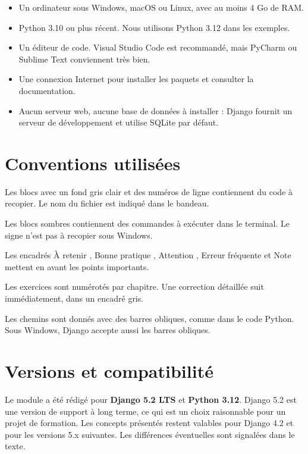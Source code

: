 \begin{itemize}
  \item Un ordinateur sous Windows, macOS ou Linux, avec au moins 4 Go de RAM.
  \item Python 3.10 ou plus récent. Nous utilisons Python 3.12 dans les exemples.
  \item Un éditeur de code. Visual Studio Code est recommandé, mais PyCharm ou
        Sublime Text conviennent très bien.
  \item Une connexion Internet pour installer les paquets et consulter la
        documentation.
  \item Aucun serveur web, aucune base de données à installer : Django fournit un
        serveur de développement et utilise SQLite par défaut.
\end{itemize}

\section*{Conventions utilisées}

\begin{description}[leftmargin=3.2cm,style=nextline]
  \item[Code Python] Les blocs avec un fond gris clair et des numéros de ligne
  contiennent du code à recopier. Le nom du fichier est indiqué dans le bandeau.
  \item[Terminal] Les blocs sombres contiennent des commandes à exécuter dans le
  terminal. Le signe \code{\$} n'est pas à recopier sous Windows.
  \item[Encadrés] Les encadrés \og À retenir \fg, \og Bonne pratique \fg,
  \og Attention \fg, \og Erreur fréquente \fg{} et \og Note \fg{} mettent en avant
  les points importants.
  \item[Exercices] Les exercices sont numérotés par chapitre. Une correction
  détaillée suit immédiatement, dans un encadré gris.
  \item[Chemins] Les chemins sont donnés avec des barres obliques, comme dans le
  code Python. Sous Windows, Django accepte aussi les barres obliques.
\end{description}

\section*{Versions et compatibilité}

Le module a été rédigé pour \textbf{Django 5.2 LTS} et \textbf{Python 3.12}. Django
5.2 est une version de support à long terme, ce qui est un choix raisonnable pour
un projet de formation. Les concepts présentés restent valables pour Django 4.2 et
pour les versions 5.x suivantes. Les différences éventuelles sont signalées dans
le texte.

